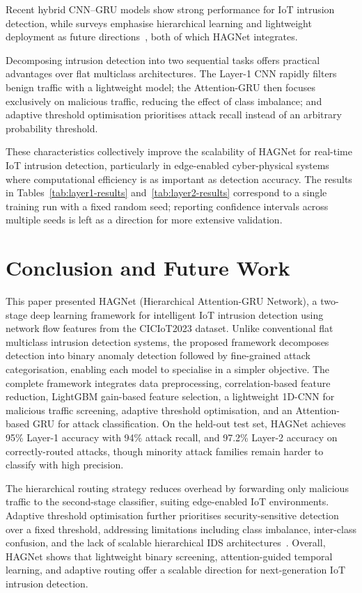 \documentclass{llncs}
\begin{document}
Recent hybrid CNN--GRU models show strong performance for IoT intrusion detection, while surveys emphasise hierarchical learning and lightweight deployment as future directions~\cite{ref6,ref7,ref4}, both of which HAGNet integrates.

Decomposing intrusion detection into two sequential tasks offers practical advantages over flat multiclass architectures. The Layer-1 CNN rapidly filters benign traffic with a lightweight model; the Attention-GRU then focuses exclusively on malicious traffic, reducing the effect of class imbalance; and adaptive threshold optimisation prioritises attack recall instead of an arbitrary probability threshold.

These characteristics collectively improve the scalability of HAGNet for real-time IoT intrusion detection, particularly in edge-enabled cyber-physical systems where computational efficiency is as important as detection accuracy. The results in Tables~\ref{tab:layer1-results} and~\ref{tab:layer2-results} correspond to a single training run with a fixed random seed; reporting confidence intervals across multiple seeds is left as a direction for more extensive validation.

\section{Conclusion and Future Work}
\label{sec:conclusion}

This paper presented HAGNet (Hierarchical Attention-GRU Network), a two-stage deep learning framework for intelligent IoT intrusion detection using network flow features from the CICIoT2023 dataset. Unlike conventional flat multiclass intrusion detection systems, the proposed framework decomposes detection into binary anomaly detection followed by fine-grained attack categorisation, enabling each model to specialise in a simpler objective. The complete framework integrates data preprocessing, correlation-based feature reduction, LightGBM gain-based feature selection, a lightweight 1D-CNN for malicious traffic screening, adaptive threshold optimisation, and an Attention-based GRU for attack classification. On the held-out test set, HAGNet achieves 95\% Layer-1 accuracy with 94\% attack recall, and 97.2\% Layer-2 accuracy on correctly-routed attacks, though minority attack families remain harder to classify with high precision.

The hierarchical routing strategy reduces overhead by forwarding only malicious traffic to the second-stage classifier, suiting edge-enabled IoT environments. Adaptive threshold optimisation further prioritises security-sensitive detection over a fixed threshold, addressing limitations including class imbalance, inter-class confusion, and the lack of scalable hierarchical IDS architectures~\cite{ref1,ref2,ref5}. Overall, HAGNet shows that lightweight binary screening, attention-guided temporal learning, and adaptive routing offer a scalable direction for next-generation IoT intrusion detection.
\end{document}
